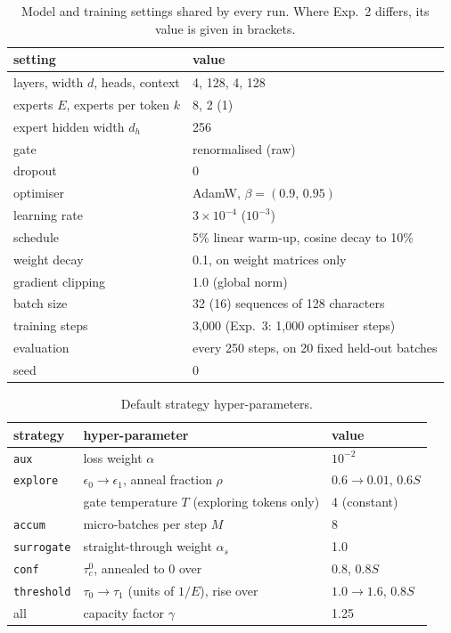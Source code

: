 \documentclass[10pt]{article}
\theoremstyle{definition}
\theoremstyle{remark}
\newcommand{\code}[1]{\texttt{#1}}
\begin{document}
\begin{table}[H]
\centering
\caption{Model and training settings shared by every run. Where Exp.~2 differs, its value is given in brackets.}
\label{tab:train}
\small
\begin{tabular}{ll}
\toprule
setting & value \\
\midrule
layers, width $d$, heads, context & 4, 128, 4, 128 \\
experts $E$, experts per token $k$ & 8, 2 (1) \\
expert hidden width $d_h$ & 256 \\
gate & renormalised (raw) \\
dropout & 0 \\
optimiser & AdamW, $\beta=(0.9,\,0.95)$ \\
learning rate & $3\times10^{-4}$ ($10^{-3}$) \\
schedule & 5\% linear warm-up, cosine decay to 10\% \\
weight decay & 0.1, on weight matrices only \\
gradient clipping & 1.0 (global norm) \\
batch size & 32 (16) sequences of 128 characters \\
training steps & 3{,}000 (Exp.~3: 1{,}000 optimiser steps) \\
evaluation & every 250 steps, on 20 fixed held-out batches \\
seed & 0 \\
\bottomrule
\end{tabular}
\end{table}

\begin{table}[H]
\centering
\caption{Default strategy hyper-parameters.}
\label{tab:hparams}
\small
\begin{tabular}{lll}
\toprule
strategy & hyper-parameter & value \\
\midrule
\code{aux} & loss weight $\alpha$ & $10^{-2}$ \\
\code{explore} & $\epsilon_0\to\epsilon_1$, anneal fraction $\rho$ & $0.6\to0.01$, $0.6S$ \\
 & gate temperature $T$ (exploring tokens only) & 4 (constant) \\
\code{accum} & micro-batches per step $M$ & 8 \\
\code{surrogate} & straight-through weight $\alpha_s$ & 1.0 \\
\code{conf} & $\tau_c^0$, annealed to 0 over & 0.8, $0.8S$ \\
\code{threshold} & $\tau_0\to\tau_1$ (units of $1/E$), rise over & $1.0\to1.6$, $0.8S$ \\
all & capacity factor $\gamma$ & 1.25 \\
\bottomrule
\end{tabular}
\end{table}
\end{document}
